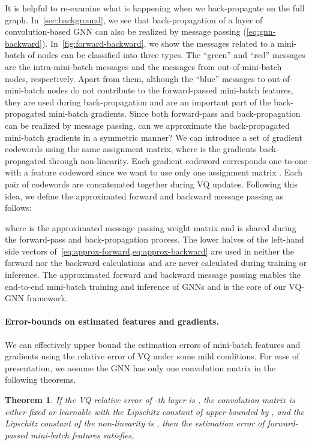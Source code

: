 \documentclass{article}
\newtheorem{theorem}{Theorem}
\newcommand{\cm}{\paragraph}
\begin{document}
It is helpful to re-examine what is happening when we back-propagate on the full graph. In~\cref{sec:background}, we see that back-propagation of a layer of convolution-based GNN can also be realized by message passing (\cref{eq:gnn-backward}). In~\cref{fig:forward-backward}, we show the messages related to a mini-batch of nodes can be classified into three types. The ``green'' and ``red'' messages are the intra-mini-batch messages and the messages from out-of-mini-batch nodes, respectively. Apart from them, although the ``blue'' messages to out-of-mini-batch nodes do not contribute to the forward-passed mini-batch features, they are used during back-propagation and are an important part of the back-propagated mini-batch gradients. Since both forward-pass and back-propagation can be realized by message passing, can we approximate the back-propagated mini-batch gradients  in a symmetric manner? We can introduce a set of gradient codewords  using the same assignment matrix, where  is the gradients back-propagated through non-linearity. Each gradient codeword corresponds one-to-one with a feature codeword since we want to use only one assignment matrix . Each pair of codewords are concatenated together during VQ updates. Following this idea, we define the approximated forward and backward message passing as follows:

\vspace{-5pt}

where  is the approximated message passing weight matrix and is shared during the forward-pass and back-propagation process. The lower halves of the left-hand side vectors of~\cref{eq:approx-forward,eq:approx-backward} are used in neither the forward nor the backward calculations and are never calculated during training or inference. The approximated forward and backward message passing enables the end-to-end mini-batch training and inference of GNNs and is the core of our VQ-GNN framework.



\cm{Error-bounds on estimated features and gradients.}
We can effectively upper bound the estimation errors of mini-batch features and gradients using the relative error  of VQ under some mild conditions. For ease of presentation, we assume the GNN has only one convolution matrix in the following theorems.
\begin{theorem}
\label{thm:feat-error}
If the VQ relative error of -th layer is , the convolution matrix  is either fixed or learnable with the Lipschitz constant of  upper-bounded by , and the Lipschitz constant of the non-linearity is , then the estimation error of forward-passed mini-batch features satisfies,

\end{theorem}
\end{document}
